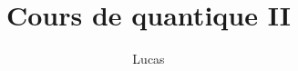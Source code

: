 \documentclass[a4paper,12pt]{report}
\begin{document}
\newtheorem*{thm}{Théorème}

\newtheorem*{definition}{Définition}
\author{Lucas}
\title{Cours de quantique II}



\maketitle
\tableofcontents




\end{document}
